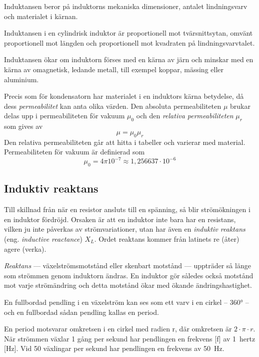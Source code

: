 Induktansen beror på induktorns mekaniska dimensioner, antalet lindningsvarv och
materialet i kärnan.

Induktansen i en cylindrisk induktor är proportionell mot tvärsnittsytan, omvänt
proportionell mot längden och proportionell mot kvadraten på lindningsvarvtalet.

Induktansen ökar om induktorn förses med en kärna av järn och minskar med en
kärna av omagnetisk, ledande metall, till exempel koppar, mässing eller aluminium.

Precis som för kondensatorn har materialet i en induktors kärna betydelse,
då dess \emph{permeabilitet} kan anta olika värden. Den absoluta permeabiliteten
\(\mu\) brukar delas upp i permeabiliteten för vakuum \(\mu_0\) och den
\emph{relativa permeabiliteten} \(\mu_r\) som gives av
\[\mu = \mu_0\mu_r\]
Den relativa permeabiliteten går att hitta i tabeller och varierar med material.
Permeabiliteten för vakuum är definierad som
\[\mu_0 = 4\pi 10^{-7} \approx 1,256637 \cdot 10^{-6}\]

\subsection{Induktiv reaktans}
\label{induktiv_reaktans} 

Till skillnad från när en resistor ansluts till en spänning, så blir
strömökningen i en induktor fördröjd. Orsaken är att en induktor inte bara har
en resistans, vilken ju inte påverkas av strömvariationer, utan har även en
\emph{induktiv reaktans} (eng. \emph{inductive reactance}) \(X_L\). Ordet
reaktans kommer från latinets re (åter) agere (verka).

\emph{Reaktans} --- växelströmsmotstånd eller skenbart motstånd --- uppträder så
länge som strömmen genom induktorn ändras. En induktor gör således också
motstånd mot varje strömändring och detta motstånd ökar med ökande
ändringshastighet.

En fullbordad pendling i en växelström kan ses som ett varv i en cirkel --
\ang{360} -- och en fullbordad sådan pendling kallas en period.

En period motsvarar omkretsen i en cirkel med radien r, där omkretsen är
\(2 \cdot \pi  \cdot r\). När strömmen växlar 1 gång per sekund har
pendlingen en frekvens [f] av 1~hertz [Hz].
Vid 50 växlingar per sekund har pendlingen en frekvens av \SI{50}{\hertz}.


